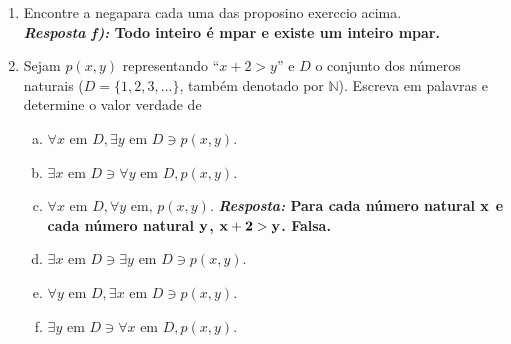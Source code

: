 \begin{enumerate}[{\bf 1.}]
\begin{enumerate}[a)]
{\bf{\it Resposta:}  Sejam ${\bf D}$ o conjunto dos n\'umeros inteiros pares, ${\bf p(x,y)}$ ``${\bf x+y}$ pertence \`a D''. Ent\ao a proposi\cao \'e ${\bf \forall x,y \textrm{ em } D, p(x,y)}$.}

\item Todo subconjunto fechado e limitado de $\mathbb{R}$ \'e compacto.

{\bf{\it Resposta:}  Sejam ${\bf D}$ o conjunto dos subconjuntos de $\mathbb{R}$, ${\bf p(x)}$ ``${\bf x}$ \'e fechado'', ${\bf q(x)}$ ``${\bf x}$ \'e limitado'', ${\bf r(x)}$ ``${\bf x}$ \'e compacto''. Ent\ao a proposi\cao \'e \\ ${\bf \forall x \textrm{ em } D, p(x)\ee q(x)\to r(x)}$.}
\end{enumerate}

\item Encontre a nega\cao para cada uma das proposi\coes no exerc\ih cio acima.\\
{\bf{\it Resposta f):} Todo inteiro \'e \ih mpar e existe um inteiro \ih mpar.}\\

\item Sejam $p(x,y)$ representando ``$x+2>y$'' e $D$ o conjunto dos n\'umeros naturais ($D=\{1,2,3,...\}$, tamb\'em denotado por $\mathbb{N}$). Escreva em palavras e determine o valor verdade de
\begin{enumerate}[a)]
\item $\forall x \textrm{ em } D, \exists y \textrm{ em } D \ni p(x,y)$.
\item $\exists x \textrm{ em } D \ni \forall y \textrm{ em } D, p(x,y)$.
\item $\forall x \textrm{ em } D, \forall y \textrm{ em, } p(x,y)$. {\bf{\it Resposta:} Para cada n\'umero natural ${\bf x}$ e cada n\'umero natural ${\bf y}$, ${\bf x+2>y}$. Falsa.}
\item $\exists x \textrm{ em } D \ni \exists y \textrm{ em } D \ni p(x,y)$.
\item $\forall y \textrm{ em } D, \exists x \textrm{ em } D \ni p(x,y)$.
\item $\exists y \textrm{ em } D \ni \forall x \textrm{ em } D, p(x,y)$.
\end{enumerate} 


\end{enumerate}
